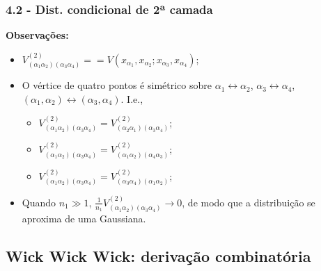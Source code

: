 \documentclass{beamer}
\begin{document}
\begin{frame}
    \frametitle{4.2 - Dist. condicional de 2ª camada}
    \textbf{Observações:}
    \begin{itemize}
        \item $V_{(\alpha_1 \alpha_2)(\alpha_3 \alpha_4)}^{(2)} == V(x_{\alpha_1},x_{\alpha_2};x_{\alpha_3},x_{\alpha_4})$;
        \item O vértice de quatro pontos é simétrico sobre $\alpha_1 \leftrightarrow \alpha_2$, $\alpha_3 \leftrightarrow \alpha_4$, $(\alpha_1,\alpha_2) \leftrightarrow (\alpha_3,\alpha_4)$. \pause I.e., \begin{itemize}
            \item $V_{(\alpha_1 \alpha_2)(\alpha_3 \alpha_4)}^{(2)} = V_{(\alpha_2 \alpha_1)(\alpha_3 \alpha_4)}^{(2)}$;
            \item $V_{(\alpha_1 \alpha_2)(\alpha_3 \alpha_4)}^{(2)} = V_{(\alpha_1 \alpha_2)(\alpha_4 \alpha_3)}^{(2)}$;
            \item $V_{(\alpha_1 \alpha_2)(\alpha_3 \alpha_4)}^{(2)} = V_{(\alpha_3 \alpha_4)(\alpha_1 \alpha_2)}^{(2)}$;
        \end{itemize} \pause
    \item Quando $n_1 \gg 1$, $\frac{1}{n_1} V_{(\alpha_1 \alpha_2)(\alpha_3 \alpha_4)}^{(2)} \to 0$, de modo que a distribuição se aproxima de uma Gaussiana.
    \end{itemize}
\end{frame}

\subsection{Wick Wick Wick: derivação combinatória}
\begin{frame}
\tableofcontents[currentsubsection]
\end{frame}
\end{document}
